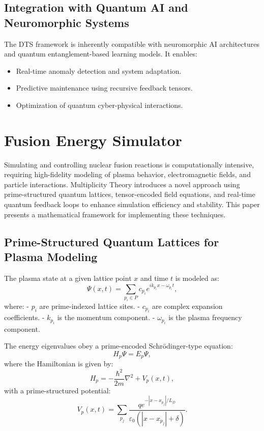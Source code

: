 \documentclass{article}
\theoremstyle{plain}
\begin{document}
\begin{itemize}
\begin{itemize}
\subsection{Integration with Quantum AI and Neuromorphic Systems}
The DTS framework is inherently compatible with neuromorphic AI architectures and quantum entanglement-based learning models. It enables:
\begin{itemize}
    \item Real-time anomaly detection and system adaptation.
    \item Predictive maintenance using recursive feedback tensors.
    \item Optimization of quantum cyber-physical interactions.
\end{itemize}

\section{Fusion Energy Simulator}
Simulating and controlling nuclear fusion reactions is computationally intensive, requiring high-fidelity modeling of plasma behavior, electromagnetic fields, and particle interactions. Multiplicity Theory introduces a novel approach using prime-structured quantum lattices, tensor-encoded field equations, and real-time quantum feedback loops to enhance simulation efficiency and stability. This paper presents a mathematical framework for implementing these techniques.

\subsection{Prime-Structured Quantum Lattices for Plasma Modeling}

The plasma state at a given lattice point $x$ and time $t$ is modeled as:
\begin{equation}
    \Psi(x, t) = \sum_{p_i \in P} c_{p_i} e^{i k_{p_i} x - \omega_{p_i} t},
\end{equation}
where:
- $p_i$ are prime-indexed lattice sites.
- $c_{p_i}$ are complex expansion coefficients.
- $k_{p_i}$ is the momentum component.
- $\omega_{p_i}$ is the plasma frequency component.

The energy eigenvalues obey a prime-encoded Schr\"odinger-type equation:
\begin{equation}
    H_p \Psi = E_p \Psi,
\end{equation}
where the Hamiltonian is given by:
\begin{equation}
    H_p = -\frac{\hbar^2}{2m} \nabla^2 + V_p(x, t),
\end{equation}
with a prime-structured potential:
\begin{equation}
    V_p(x, t) = \sum_{p_j} \frac{q e^{-|x-x_{p_j}|/L_D}}{\varepsilon_0 (|x-x_{p_j}| + \delta)}.
\end{equation}


\end{itemize}
\end{itemize}
\end{document}

